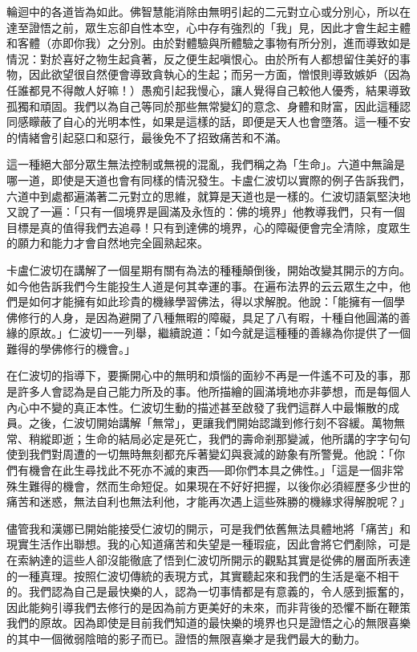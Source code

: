 輪迴中的各道皆為如此。佛智慧能消除由無明引起的二元對立心或分別心，所以在達至證悟之前，眾生忘卻自性本空，心中存有強烈的「我」見，因此才會生起主體和客體（亦即你我）之分別。由於對體驗與所體驗之事物有所分別，進而導致如是情況：對於喜好之物生起貪著，反之便生起嗔恨心。由於所有人都想留住美好的事物，因此欲望很自然便會導致貪執心的生起；而另一方面，憎恨則導致嫉妒（因為任誰都見不得敵人好嘛！）愚痴引起我慢心，讓人覺得自己較他人優秀，結果導致孤獨和頑固。我們以為自己等同於那些無常變幻的意念、身體和財富，因此這種認同感矇蔽了自心的光明本性，如果是這樣的話，即便是天人也會墮落。這一種不安的情緒會引起惡口和惡行，最後免不了招致痛苦和不滿。

這一種絕大部分眾生無法控制或無視的混亂，我們稱之為「生命」。六道中無論是哪一道，即使是天道也會有同樣的情況發生。卡盧仁波切以實際的例子告訴我們，六道中到處都遍滿著二元對立的思維，就算是天道也是一樣的。仁波切語氣堅決地又說了一遍：「只有一個境界是圓滿及永恆的：佛的境界」他教導我們，只有一個目標是真的值得我們去追尋！只有到達佛的境界，心的障礙便會完全清除，度眾生的願力和能力才會自然地完全圓熟起來。

卡盧仁波切在講解了一個星期有關有為法的種種顛倒後，開始改變其開示的方向。如今他告訴我們今生能投生人道是何其幸運的事。在遍布法界的云云眾生之中，他們是如何才能擁有如此珍貴的機緣學習佛法，得以求解脫。他說：「能擁有一個學佛修行的人身，是因為避開了八種無暇的障礙，具足了八有暇，十種自他圓滿的善緣的原故。」仁波切一一列舉，繼續說道：「如今就是這種種的善緣為你提供了一個難得的學佛修行的機會。」

在仁波切的指導下，要撕開心中的無明和煩惱的面紗不再是一件遙不可及的事，那是許多人會認為是自己能力所及的事。他所描繪的圓滿境地亦非夢想，而是每個人內心中不變的真正本性。仁波切生動的描述甚至啟發了我們這群人中最懶散的成員。之後，仁波切開始講解「無常」，更讓我們開始認識到修行刻不容緩。萬物無常、稍縱即逝；生命的結局必定是死亡，我們的壽命剎那變滅，他所講的字字句句使到我們對周遭的一切無時無刻都充斥著變幻與衰減的跡象有所警覺。他說：「你們有機會在此生尋找此不死亦不滅的東西──即你們本具之佛性。」「這是一個非常殊生難得的機會，然而生命短促。如果現在不好好把握，以後你必須經歷多少世的痛苦和迷惑，無法自利也無法利他，才能再次遇上這些殊勝的機緣求得解脫呢？」

儘管我和漢娜已開始能接受仁波切的開示，可是我們依舊無法具體地將「痛苦」和現實生活作出聯想。我的心知道痛苦和失望是一種瑕疵，因此會將它們剷除，可是在索納達的這些人卻沒能徹底了悟到仁波切所開示的觀點其實是從佛的層面所表達的一種真理。按照仁波切傳統的表現方式，其實聽起來和我們的生活是毫不相干的。我們認為自己是最快樂的人，認為一切事情都是有意義的，令人感到振奮的，因此能夠引導我們去修行的是因為前方更美好的未來，而非背後的恐懼不斷在鞭策我們的原故。因為即使是目前我們知道的最快樂的境界也只是證悟之心的無限喜樂的其中一個微弱陰暗的影子而已。證悟的無限喜樂才是我們最大的動力。

